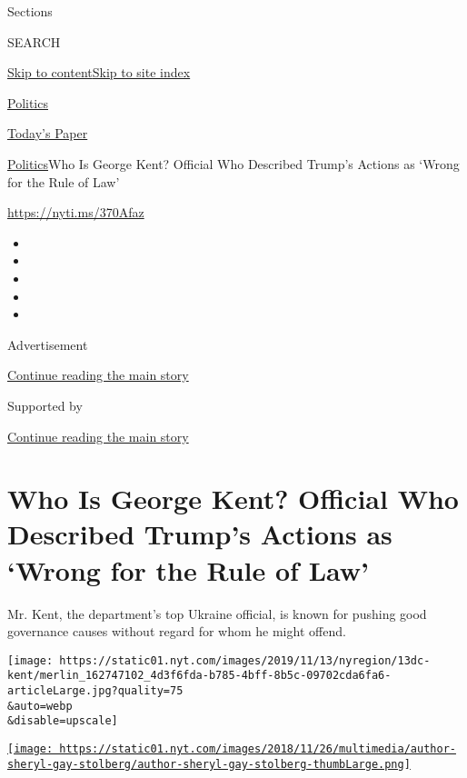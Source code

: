 Sections

SEARCH

\protect\hyperlink{site-content}{Skip to
content}\protect\hyperlink{site-index}{Skip to site index}

\href{https://www.nytimes.com/section/politics}{Politics}

\href{https://myaccount.nytimes.com/auth/login?response_type=cookie\&client_id=vi}{}

\href{https://www.nytimes.com/section/todayspaper}{Today's Paper}

\href{/section/politics}{Politics}\textbar{}Who Is George Kent? Official
Who Described Trump's Actions as `Wrong for the Rule of Law'

\url{https://nyti.ms/370Afaz}

\begin{itemize}
\item
\item
\item
\item
\item
\end{itemize}

Advertisement

\protect\hyperlink{after-top}{Continue reading the main story}

Supported by

\protect\hyperlink{after-sponsor}{Continue reading the main story}

\hypertarget{who-is-george-kent-official-who-described-trumps-actions-as-wrong-for-the-rule-of-law}{%
\section{Who Is George Kent? Official Who Described Trump's Actions as
`Wrong for the Rule of
Law'}\label{who-is-george-kent-official-who-described-trumps-actions-as-wrong-for-the-rule-of-law}}

Mr. Kent, the department's top Ukraine official, is known for pushing
good governance causes without regard for whom he might offend.

\texttt{[image: https://static01.nyt.com/images/2019/11/13/nyregion/13dc-kent/merlin\_162747102\_4d3f6fda-b785-4bff-8b5c-09702cda6fa6-articleLarge.jpg?quality=75\\\&auto=webp\\\&disable=upscale]}

\href{https://www.nytimes.com/by/sheryl-gay-stolberg}{\texttt{[image: https://static01.nyt.com/images/2018/11/26/multimedia/author-sheryl-gay-stolberg/author-sheryl-gay-stolberg-thumbLarge.png]}}

